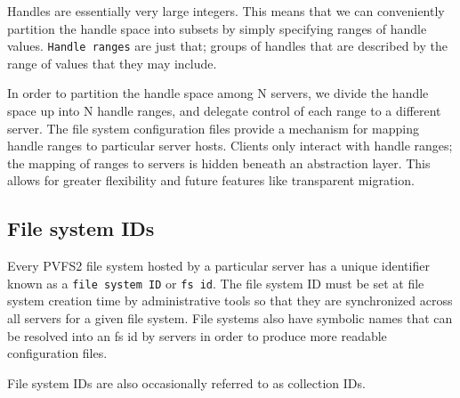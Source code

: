 Handles are essentially very large integers.  This means that we can
conveniently partition the handle space into subsets by simply specifying
ranges of handle values.  \texttt{Handle ranges} are just that; groups
of handles that are described by the range of values that they may
include.

In order to partition the handle space among N servers, we divide the
handle space up into N handle ranges, and delegate control of each range
to a different server.  The file system configuration files provide
a mechanism for mapping handle ranges to particular server hosts.
Clients only interact with handle ranges; the mapping of ranges to
servers is hidden beneath an abstraction layer. This allows for greater
flexibility and future features like transparent migration.

\subsection{File system IDs}

Every PVFS2 file system hosted by a particular server has a unique
identifier known as a \texttt{file system ID} or \texttt{fs id}.  The file
system ID must be set at file system creation time by administrative tools
so that they are synchronized across all servers for a given file system.
File systems also have symbolic names that can be resolved into an fs id
by servers in order to produce more readable configuration files.

File system IDs are also occasionally referred to as collection IDs.
